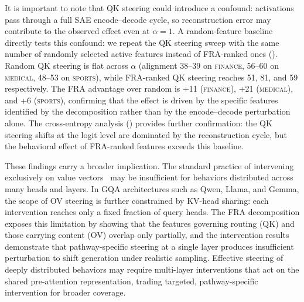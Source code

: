 \documentclass{article}
\theoremstyle{plain}
\theoremstyle{definition}
\theoremstyle{remark}
\begin{document}
It is important to note that QK steering could introduce a confound: activations pass through a full SAE encode--decode cycle, so reconstruction error may contribute to the observed effect even at $\alpha{=}1$. A random-feature baseline directly tests this confound: we repeat the QK steering sweep with the same number of randomly selected active features instead of FRA-ranked ones (). Random QK steering is flat across $\alpha$ (alignment 38--39 on \textsc{finance}, 56--60 on \textsc{medical}, 48--53 on \textsc{sports}), while FRA-ranked QK steering reaches 51, 81, and 59 respectively. The FRA advantage over random is +11 (\textsc{finance}), +21 (\textsc{medical}), and +6 (\textsc{sports}), confirming that the effect is driven by the specific features identified by the decomposition rather than by the encode--decode perturbation alone. The cross-entropy analysis () provides further confirmation: the QK steering shifts at the logit level are dominated by the reconstruction cycle, but the behavioral effect of FRA-ranked features exceeds this baseline.

These findings carry a broader implication. The standard practice of intervening exclusively on value vectors~\citep{marks2024sparse} may be insufficient for behaviors distributed across many heads and layers. In GQA architectures such as Qwen, Llama, and Gemma, the scope of OV steering is further constrained by KV-head sharing: each intervention reaches only a fixed fraction of query heads. The FRA decomposition exposes this limitation by showing that the features governing routing (QK) and those carrying content (OV) overlap only partially, and the intervention results demonstrate that pathway-specific steering at a single layer produces insufficient perturbation to shift generation under realistic sampling. Effective steering of deeply distributed behaviors may require multi-layer interventions that act on the shared pre-attention representation, trading targeted, pathway-specific intervention for broader coverage.




\end{document}
